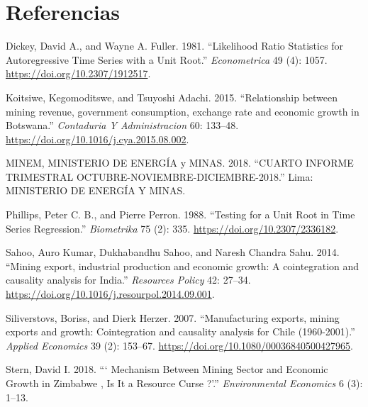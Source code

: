 \documentclass[11pt,]{article}
\begin{document}
\hypertarget{referencias}{%
\section{Referencias}\label{referencias}}

\setlength{\parindent}{-0.2in}
\setlength{\leftskip}{0.2in}
\setlength{\parskip}{8pt}
\vspace*{-0.2in}

\noindent

\hypertarget{refs}{}
\leavevmode\hypertarget{ref-Dickey1981}{}%
Dickey, David A., and Wayne A. Fuller. 1981. ``Likelihood Ratio
Statistics for Autoregressive Time Series with a Unit Root.''
\emph{Econometrica} 49 (4): 1057. \url{https://doi.org/10.2307/1912517}.

\leavevmode\hypertarget{ref-Koitsiwe2015}{}%
Koitsiwe, Kegomoditswe, and Tsuyoshi Adachi. 2015. ``Relationship
between mining revenue, government consumption, exchange rate and
economic growth in Botswana.'' \emph{Contaduria Y Administracion} 60:
133--48. \url{https://doi.org/10.1016/j.cya.2015.08.002}.

\leavevmode\hypertarget{ref-MINEM2018}{}%
MINEM, MINISTERIO DE ENERGÍA y MINAS. 2018. ``CUARTO INFORME TRIMESTRAL
OCTUBRE-NOVIEMBRE-DICIEMBRE-2018.'' Lima: MINISTERIO DE ENERGÍA Y MINAS.

\leavevmode\hypertarget{ref-Phillips1988}{}%
Phillips, Peter C. B., and Pierre Perron. 1988. ``Testing for a Unit
Root in Time Series Regression.'' \emph{Biometrika} 75 (2): 335.
\url{https://doi.org/10.2307/2336182}.

\leavevmode\hypertarget{ref-Sahoo2014}{}%
Sahoo, Auro Kumar, Dukhabandhu Sahoo, and Naresh Chandra Sahu. 2014.
``Mining export, industrial production and economic growth: A
cointegration and causality analysis for India.'' \emph{Resources
Policy} 42: 27--34.
\url{https://doi.org/10.1016/j.resourpol.2014.09.001}.

\leavevmode\hypertarget{ref-Siliverstovs2007}{}%
Siliverstovs, Boriss, and Dierk Herzer. 2007. ``Manufacturing exports,
mining exports and growth: Cointegration and causality analysis for
Chile (1960-2001).'' \emph{Applied Economics} 39 (2): 153--67.
\url{https://doi.org/10.1080/00036840500427965}.

\leavevmode\hypertarget{ref-Stern2018}{}%
Stern, David I. 2018. ``` Mechanism Between Mining Sector and Economic
Growth in Zimbabwe , Is It a Resource Curse ?'.'' \emph{Environmental
Economics} 6 (3): 1--13.




\newpage
\singlespacing 
\end{document}
